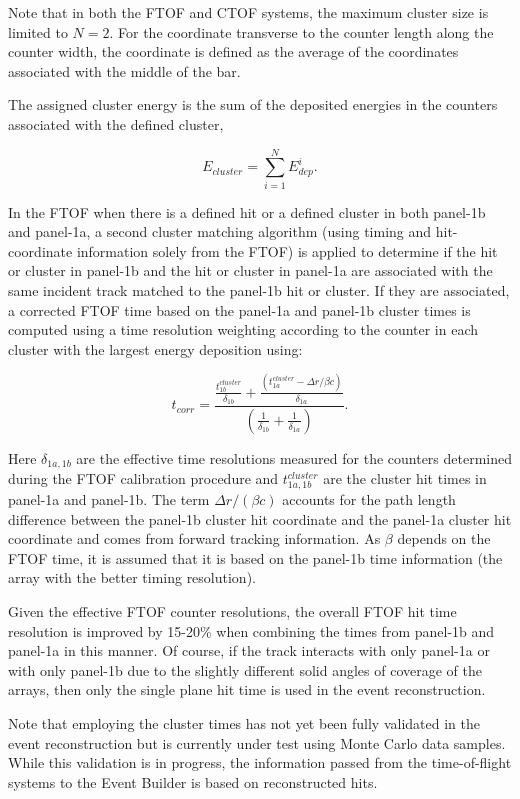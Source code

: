 \noindent
Note that in both the FTOF and CTOF systems, the maximum cluster size is limited to $N=2$. For the coordinate
transverse to the counter length along the counter width, the coordinate is defined as the average of the
coordinates associated with the middle of the bar.

The assigned cluster energy is the sum of the deposited energies in the counters associated with the defined
cluster,

\begin{equation}
  E_{cluster} = \sum_{i=1}^N E_{dep}^i.
\end{equation}

In the FTOF when there is a defined hit or a defined cluster in both panel-1b and panel-1a, a second cluster matching
algorithm (using timing and hit-coordinate information solely from the FTOF) is applied to determine if the hit
or cluster in panel-1b and the hit or cluster in panel-1a are associated with the same incident track matched to
the panel-1b hit or cluster. If they are associated, a corrected FTOF time based on the panel-1a and panel-1b
cluster times is computed using a time resolution weighting according to the counter in each cluster with the
largest energy deposition using:

\begin{equation}
  t_{corr} = \frac{\displaystyle \frac{\displaystyle t_{1b}^{cluster}}{\displaystyle \delta_{1b}} +
    \frac{\displaystyle (t_{1a}^{cluster} - \Delta r/\beta c)}{\displaystyle \delta_{1a}}}
  {\displaystyle \left( \frac{\displaystyle 1}{\displaystyle \delta_{1b}} +
    \frac{\displaystyle 1}{\displaystyle \delta_{1a}} \right)}.
\end{equation}

\noindent
Here $\delta_{1a,1b}$ are the effective time resolutions measured for the counters determined during the
FTOF calibration procedure and $t_{1a,1b}^{cluster}$ are the cluster hit times in panel-1a and panel-1b. The term
$\Delta r/(\beta c)$ accounts for the path length difference between the panel-1b cluster hit coordinate and
the panel-1a cluster hit coordinate and comes from forward tracking information. As $\beta$ depends on the
FTOF time, it is assumed that it is based on the panel-1b time information (the array with the better timing
resolution).

Given the effective FTOF counter resolutions, the overall FTOF hit time resolution is improved by 15-20\%
when combining the times from panel-1b and panel-1a in this manner. Of course, if the track interacts with only
panel-1a or with only panel-1b due to the slightly different solid angles of coverage of the arrays, then only the
single plane hit time is used in the event reconstruction. 

Note that employing the cluster times has not yet been fully validated in the event reconstruction but is currently
under test using Monte Carlo data samples. While this validation is in progress, the information passed from the
time-of-flight systems to the Event Builder is based on reconstructed hits.
